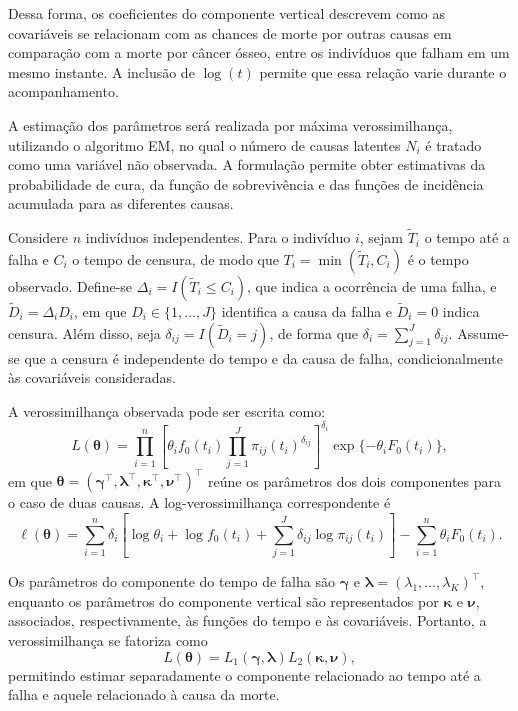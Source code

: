 \documentclass[11pt,a4paper]{article}
\begin{document}
Dessa forma, os coeficientes do componente vertical descrevem como as covariáveis se relacionam com as chances de morte por outras causas em comparação com a morte por câncer ósseo, entre os indivíduos que falham em um mesmo instante. A inclusão de $\log(t)$ permite que essa relação varie durante o acompanhamento. 


A estimação dos parâmetros será realizada por máxima verossimilhança, utilizando o algoritmo EM, no qual o número de causas latentes $N_i$ é tratado como uma variável não observada. A formulação permite obter estimativas da probabilidade de cura, da função de sobrevivência e das funções de incidência acumulada para as diferentes causas.

Considere $n$ indivíduos independentes. Para o indivíduo $i$, sejam $\widetilde T_i$ o tempo até a falha e $C_i$ o tempo de censura, de modo que $T_i=\min(\widetilde T_i,C_i)$ é o tempo observado. Define-se $\Delta_i=I(\widetilde T_i\leq C_i)$, que indica a ocorrência de uma falha, e $\widetilde D_i=\Delta_iD_i$, em que $D_i\in\{1,\ldots,J\}$ identifica a causa da falha e $\widetilde D_i=0$ indica censura. Além disso, seja $\delta_{ij}=I(\widetilde D_i=j)$, de forma que $\delta_i=\sum_{j=1}^{J}\delta_{ij}$. Assume-se que a censura é independente do tempo e da causa de falha, condicionalmente às covariáveis consideradas.

A verossimilhança observada pode ser escrita como:
\begin{equation}
L(\boldsymbol\theta)=\prod_{i=1}^{n}
\left[\theta_i f_0(t_i)
\prod_{j=1}^{J}\pi_{ij}(t_i)^{\delta_{ij}}\right]^{\delta_i}
\exp\{-\theta_iF_0(t_i)\},
\end{equation}
\noindent em que $\boldsymbol\theta=(\boldsymbol\gamma^\top,\boldsymbol\lambda^\top,\boldsymbol\kappa^\top,\boldsymbol\nu^\top)^\top$ reúne os parâmetros dos dois componentes para o caso de duas causas. A log-verossimilhança correspondente é
\begin{equation}
\ell(\boldsymbol\theta)=
\sum_{i=1}^{n}\delta_i\left[
\log\theta_i+\log f_0(t_i)
+\sum_{j=1}^{J}\delta_{ij}\log\pi_{ij}(t_i)\right]
-\sum_{i=1}^{n}\theta_iF_0(t_i).
\end{equation}

Os parâmetros do componente do tempo de falha são $\boldsymbol\gamma$ e $\boldsymbol\lambda=(\lambda_1,\ldots,\lambda_K)^\top$, enquanto os parâmetros do componente vertical são representados por $\boldsymbol\kappa$ e $\boldsymbol\nu$, associados, respectivamente, às funções do tempo e às covariáveis. Portanto, a verossimilhança se fatoriza como
\begin{equation}
L(\boldsymbol\theta)
=L_1(\boldsymbol\gamma,\boldsymbol\lambda)
L_2(\boldsymbol\kappa,\boldsymbol\nu),
\end{equation}
\noindent permitindo estimar separadamente o componente relacionado ao tempo até a falha e aquele relacionado à causa da morte. 
\end{document}
